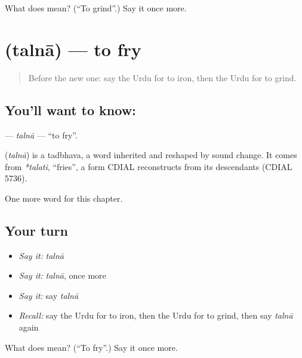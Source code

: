 \begin{tcolorbox}[breakable,colback=teal!4,colframe=teal!35!black,title={Before you move on}]
What does  mean? (\textquotedblleft{}To grind\textquotedblright{}.) Say it once more.
\end{tcolorbox}
\section[\texorpdfstring{\ur{تلنا} (talnā)}{تلنا (talnā)}]{ (talnā) — to fry}

\label{lesson:UR-C212-talna}



\begin{quote}
Before the new one: say the Urdu for to iron, then the Urdu for to grind.
\end{quote}

\subsection*{You'll want to know: }
\textbf{} — \emph{talnā} — \textquotedblleft{}to fry\textquotedblright{}.

\begin{cousinweb}
\textbf{} (\emph{talnā}) is a tadbhava, a word inherited and reshaped by sound change. It comes from \emph{*talati}, \textquotedblleft{}fries\textquotedblright{}, a form CDIAL reconstructs from its descendants (CDIAL 5736).
\end{cousinweb}

\begin{grammarlens}[title={What you've built}]
One more word for this chapter.
\end{grammarlens}

\subsection*{Your turn}
\begin{itemize}
\raggedright
  \item \emph{Say it:} \emph{talnā}
  \item \emph{Say it:} \emph{talnā}, once more
  \item \emph{Say it:} say \emph{talnā}
  \item \emph{Recall:} say the Urdu for to iron, then the Urdu for to grind, then say \emph{talnā} again
\end{itemize}

\begin{tcolorbox}[breakable,colback=teal!4,colframe=teal!35!black,title={Before you move on}]
What does  mean? (\textquotedblleft{}To fry\textquotedblright{}.) Say it once more.
\end{tcolorbox}
